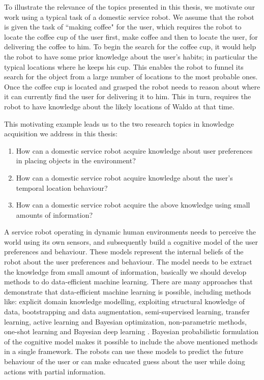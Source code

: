 To illustrate the relevance of the topics presented in this thesis, we motivate our work using a typical task of a domestic service robot.   We assume that the robot is given the task of ``making coffee" for the user, which requires the robot to locate the coffee cup of the user first, make coffee and then to locate the user, for delivering the coffee to him. To begin the search for the coffee cup, it would help the robot to have some prior knowledge about the user's habits; in particular the typical locations where he keeps his cup. This enables the robot to funnel its search for the object from a large number of locations to the most probable ones. Once the coffee cup is located and grasped the robot needs to reason about where it can currently find the user for delivering it to him. This in turn, requires the robot to have knowledge about the likely locations of Waldo at that time.

This motivating example leads us to the two research topics in knowledge acquisition we address in this thesis:
\begin{enumerate}
	\item How can a domestic service robot acquire knowledge about user preferences in placing objects in the environment?
	\item How can a domestic service robot acquire knowledge about the user's temporal location behaviour?
	\item How can a domestic service robot acquire the above knowledge using small amounts of information?
\end{enumerate}

A service robot operating in dynamic human environments needs to perceive the world using its own sensors, and subsequently build a cognitive model of the user preferences and behaviour. These models represent the internal beliefs of the robot about the user preferences and behaviour. The model needs to be extract the knowledge from small amount of information, basically we should develop methods to do data-efficient machine learning. There are many approaches that demonstrate that data-efficient machine learning is possible, including methods like: explicit domain knowledge modelling, exploiting structural knowledge of data, bootstrapping and data augmentation, semi-supervised learning, transfer learning, active learning and Bayesian optimization, non-parametric methods, one-shot learning and Bayesian deep learning \cite{https://sites.google.com/site/dataefficientml/home}. 
Bayesian probabilistic formulation of the cognitive model makes it possible to include the above mentioned methods in a single framework. The robots can use these models to predict the future behaviour of the user or can make educated guess about the user while doing actions with partial information.


